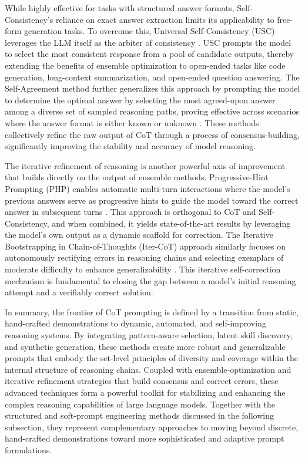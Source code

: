 \documentclass[11pt]{article}
\begin{document}
While highly effective for tasks with structured answer formats, Self-Consistency's reliance on exact answer extraction limits its applicability to free-form generation tasks. To overcome this, Universal Self-Consistency (USC) leverages the LLM itself as the arbiter of consistency \cite{ref150}. USC prompts the model to select the most consistent response from a pool of candidate outputs, thereby extending the benefits of ensemble optimization to open-ended tasks like code generation, long-context summarization, and open-ended question answering. The Self-Agreement method further generalizes this approach by prompting the model to determine the optimal answer by selecting the most agreed-upon answer among a diverse set of sampled reasoning paths, proving effective across scenarios where the answer format is either known or unknown \cite{ref151}. These methods collectively refine the raw output of CoT through a process of consensus-building, significantly improving the stability and accuracy of model reasoning.

The iterative refinement of reasoning is another powerful axis of improvement that builds directly on the output of ensemble methods. Progressive-Hint Prompting (PHP) enables automatic multi-turn interactions where the model's previous answers serve as progressive hints to guide the model toward the correct answer in subsequent turns \cite{ref152}. This approach is orthogonal to CoT and Self-Consistency, and when combined, it yields state-of-the-art results by leveraging the model's own output as a dynamic scaffold for correction. The Iterative Bootstrapping in Chain-of-Thoughts (Iter-CoT) approach similarly focuses on autonomously rectifying errors in reasoning chains and selecting exemplars of moderate difficulty to enhance generalizability \cite{ref153}. This iterative self-correction mechanism is fundamental to closing the gap between a model's initial reasoning attempt and a verifiably correct solution.

In summary, the frontier of CoT prompting is defined by a transition from static, hand-crafted demonstrations to dynamic, automated, and self-improving reasoning systems. By integrating pattern-aware selection, latent skill discovery, and synthetic generation, these methods create more robust and generalizable prompts that embody the set-level principles of diversity and coverage within the internal structure of reasoning chains. Coupled with ensemble-optimization and iterative refinement strategies that build consensus and correct errors, these advanced techniques form a powerful toolkit for stabilizing and enhancing the complex reasoning capabilities of large language models. Together with the structured and soft-prompt engineering methods discussed in the following subsection, they represent complementary approaches to moving beyond discrete, hand-crafted demonstrations toward more sophisticated and adaptive prompt formulations.
\end{document}
